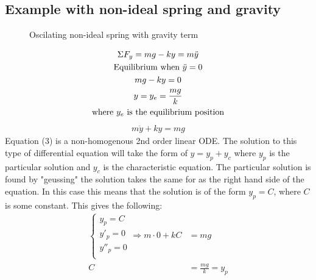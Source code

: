 \documentclass[11pt, a4paper]{article}
\begin{document}
\subsection{Example with non-ideal spring and gravity}
\setcounter{equation}{0}
\begin{figure}[h]
  \centering
  \qquad
  \caption{Oscilating non-ideal spring with gravity term}
\end{figure}
\begin{gather}
  \Sigma F_y = mg - ky = m\ddot{y}\\
  \text{Equilibrium when $\ddot{y} = 0$} \notag \\
  mg - ky = 0 \notag \\
  y = y_e = \frac{mg}{k}\\
  \text{where $y_e$ is the equilibrium position} \notag
\end{gather}
\begin{gather}
  m\ddot{y} + ky = mg
\end{gather}
Equation (3) is a non-homogenous 2nd order linear ODE. The solution to this type of differential equation will take the form of $y = y_p + y_c$ where $y_p$ is the particular solution and $y_c$ is the characteristic equation. The particular solution is found by "geussing" the solution takes the same for as the right hand side of the equation. In this case this means that the solution is of the form $y_p = C$, where $C$ is some constant. This gives the following:
\begin{align}
  \begin{cases}
    y_p = C\\ 
    y'_p = 0\\
    y''_p = 0\\
  \end{cases}
  \Rightarrow
  m \cdot 0 + kC &= mg\\
  C &= \frac{mg}{k} = y_p
\end{align}
\end{document}
